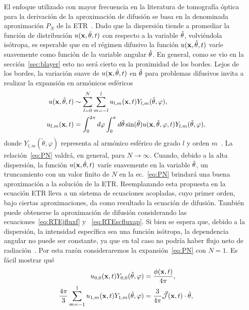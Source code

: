 El enfoque utilizado con mayor frecuencia en la literatura de tomografía óptica para la derivación de la aproximación de difusión se basa 
en la denominada aproximación $P_N$ de la ETR~\cite{Arridge2009,Wang2009}. Dado que la dispersión tiende a promediar la función de distribución $u(\mathbf{x},\hat{\theta},t)$ con respecto a la variable $\hat{\theta}$, volviéndola isótropa, es esperable que en el régimen difusivo la función $u(\mathbf{x},\hat{\theta},t)$ varíe suavemente como función de la variable angular $\hat{\theta}$. En general, como se vio en la sección~\ref{sec:blayer} esto no será cierto en la proximidad de los bordes. Lejos de los bordes, la variación suave de $u(\mathbf{x},\hat{\theta},t)$ en $\hat{\theta}$ para problemas difusivos invita a realizar la expansión en armónicos esféricos
\begin{equation}
\begin{split}
\begin{aligned}
u(\mathbf{x},\hat{\theta},t)&\sim \sum_{l=0}^{N}\sum_{m=-l}^lu_{l,m}(\mathbf{x},t)Y_{l,m}(\tilde{\theta},\varphi), \\ 
u_{l,m}(\mathbf{x},t)&=\int_{0}^{2\pi} d\varphi \int_0^{\pi} d\tilde{\theta} \sin (\tilde{\theta})  u(\mathbf{x},\tilde{\theta},\varphi,t) Y_{l,m}(\tilde{\theta},\varphi) ,
\end{aligned}
\end{split}
\label{eq:PN}
\end{equation}
donde $Y_{l,m}(\tilde{\theta},\varphi)$ representa al armónico esférico de grado $l$ y orden $m$~\cite{Sansone1991}. La relación~\eqref{eq:PN} valdrá, en general, para $N \rightarrow \infty$. Cuando, debido a la alta dispersión, la función $u(\mathbf{x},\hat{\theta},t)$ 
varíe suavemente en la variable $\hat{\theta}$, un truncamiento con un valor 
finito de $N$ en la ec.~\eqref{eq:PN} brindará una buena aproximación 
a la solución de la ETR.
Reemplazando esta propuesta en la ecuación ETR lleva a un sistema de ecuaciones acopladas, cuyo primer orden, bajo ciertas aproximaciones, da como resultado la ecuación de difusión. También puede obtenerse la aproximación de difusión considerando las ecuaciones~\eqref{eq:RTEjfluxf} y ~\eqref{eq:RTEscfluxap}. Si bien se espera que, debido a la dispersión, la intensidad específica sea una función isótropa, la dependencia angular no puede ser constante, ya que en tal caso 
no podría haber flujo neto de radiación~\cite[cap. 9, p. 176]{Ishimaru1978}. Por esta razón consideraremos la expansión~\eqref{eq:PN} con $N=1$. 
Es fácil mostrar qué
\begin{equation}
\begin{split}
\begin{aligned}
u_{0,0}(\mathbf{x},t) Y_{0,0}(\tilde{\theta},\varphi) &=\frac{\phi(\mathbf{x},t)}{4\pi},\\
\frac{4\pi}{3} \sum_{m=-1}^1 u_{1,m}(\mathbf{x},t)Y_{1,m} (\tilde{\theta},\varphi) & = \frac{3}{4\pi} \vec{ \mathcal{J}}(\mathbf{x},t) \cdot \hat{\theta},
\end{aligned}
\end{split}
\label{eq:PN2}
\end{equation}
